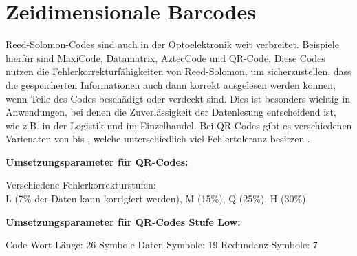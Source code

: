 \section{Zeidimensionale Barcodes}

Reed-Solomon-Codes sind auch in der Optoelektronik weit verbreitet. Beispiele hierfür sind MaxiCode, Datamatrix, AztecCode und QR-Code. 
Diese Codes nutzen die Fehlerkorrekturfähigkeiten von Reed-Solomon, um sicherzustellen, dass die gespeicherten Informationen auch dann korrekt ausgelesen werden können, wenn Teile des Codes beschädigt oder verdeckt sind. 
Dies ist besonders wichtig in Anwendungen, bei denen die Zuverlässigkeit der Datenlesung entscheidend ist, wie z.B. in der Logistik und im Einzelhandel.
Bei QR-Codes gibt es verschiedenen Varienaten von  bis , welche unterschiedlich viel Fehlertoleranz besitzen \cite{QRCode2024}.

\textbf{Umsetzungsparameter für QR-Codes:}

Verschiedene Fehlerkorrekturstufen: \\ L (7\% der Daten kann korrigiert werden), M (15\%), Q (25\%), H (30\%)

\textbf{Umsetzungsparameter für QR-Codes Stufe Low:}

Code-Wort-Länge: 26 Symbole
Daten-Symbole: 19
Redundanz-Symbole: 7
